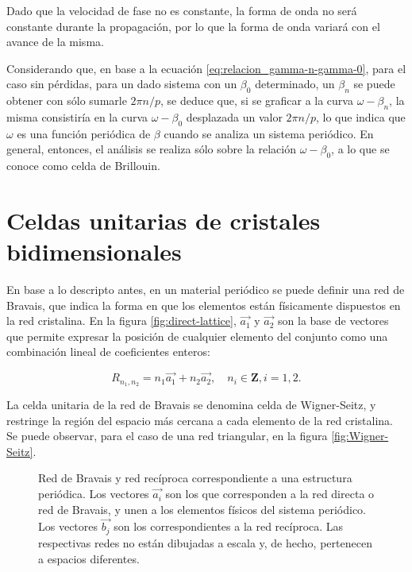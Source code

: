Dado que la velocidad de fase no es constante, la forma de onda no será constante durante la propagación, por lo que la forma de onda variará con el avance de la misma.

Considerando que, en base a la ecuación \ref{eq:relacion_gamma-n-gamma-0}, para el caso sin pérdidas, para un dado sistema con un $\beta_0$ determinado, un $\beta_n$ se puede obtener con sólo sumarle $2\pi n/p$, se deduce que, si se graficar a la curva $\omega-\beta_n$, la misma consistiría en la curva $\omega-\beta_0$ desplazada un valor $2\pi n /p$, lo que indica que $\omega$ es una función periódica de $\beta$ cuando se analiza un sistema periódico. En general, entonces, el análisis se realiza sólo sobre la relación $\omega-\beta_0$, a lo que se conoce como celda de Brillouin.

\section{Celdas unitarias de cristales bidimensionales}
\label{sec:celdas-unitarias}

En base a lo descripto antes, en un material periódico se puede definir una red de Bravais, que indica la forma en que los elementos están físicamente dispuestos en la red cristalina. En la figura \ref{fig:direct-lattice}, $\vec{a_1}$ y $\vec{a_2}$ son la base de vectores que permite expresar la posición de cualquier elemento del conjunto como una combinación lineal de coeficientes enteros:

\begin{equation}
R_{n_1,n_2} = n_1 \vec{a_1} + n_2 \vec{a_2}, \quad n_i \in \textbf{Z}, i={1,2}.
\end{equation}

La celda unitaria de la red de Bravais se denomina celda de Wigner-Seitz, y restringe la región del espacio más cercana a cada elemento de la red cristalina. Se puede observar, para el caso de una red triangular, en la figura \ref{fig:Wigner-Seitz}.

\begin{figure}[H]
	\centering 
	\hspace{0pt}
	\caption{Red de Bravais y red recíproca correspondiente a una estructura periódica. Los vectores $\vec{a_i}$ son los que corresponden a la red directa o red de Bravais, y unen a los elementos físicos del sistema periódico. Los vectores $\vec{b_j}$ son los correspondientes a la red recíproca. Las respectivas redes no están dibujadas a escala y, de hecho, pertenecen a espacios diferentes.}
	\label{fig:direct-and-reciprocal-lattice}
\end{figure}

